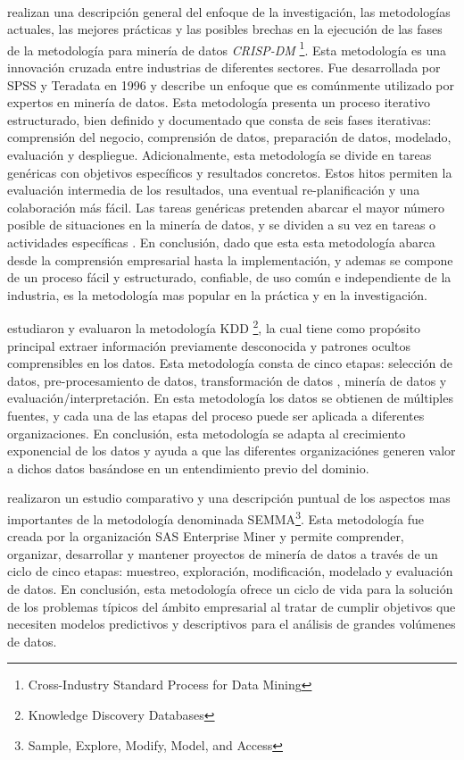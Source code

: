 \\
\cite{Schroer2021} realizan una descripción general del enfoque de la investigación, las metodologías actuales, las mejores prácticas y las posibles brechas en la ejecución de las fases de la metodología para minería de datos \textit{CRISP-DM} \footnote{Cross-Industry Standard Process for Data Mining }. Esta metodología es una innovación cruzada entre industrias de diferentes sectores. Fue desarrollada por SPSS y Teradata en 1996 y describe un enfoque  que es comúnmente utilizado por expertos en minería de datos. Esta metodología presenta un proceso iterativo estructurado, bien definido y documentado que consta de seis fases iterativas: comprensión del negocio, comprensión de datos, preparación de datos, modelado, evaluación y despliegue. Adicionalmente, esta metodología se divide en tareas genéricas con objetivos específicos y resultados concretos. Estos hitos permiten la evaluación intermedia de los resultados, una eventual re-planificación y una colaboración más fácil. Las tareas genéricas pretenden abarcar el mayor número posible de situaciones en la minería de datos, y se dividen a su vez en tareas o actividades específicas \cite{Mladenic2012}. En conclusión, dado que esta esta metodología abarca desde la comprensión empresarial hasta la implementación, y ademas se compone de un proceso fácil y estructurado, confiable, de uso común e independiente de la industria, es la metodología mas popular en la práctica y en la investigación.

\cite{Safhi2019} estudiaron y evaluaron la metodología KDD \footnote{Knowledge Discovery Databases}, la cual tiene como propósito principal  extraer información previamente desconocida y patrones ocultos comprensibles en los datos. Esta metodología consta de cinco etapas: selección de datos,  pre-procesamiento de datos, transformación de datos , minería de datos y evaluación/interpretación. En esta metodología los datos se obtienen de múltiples fuentes, y cada una de las etapas del proceso puede ser aplicada a diferentes organizaciones. En conclusión, esta metodología se adapta al crecimiento exponencial de los datos y ayuda a que las diferentes organizaciónes generen valor a dichos datos basándose en un entendimiento previo del dominio.

\cite{Shafique2014} realizaron un estudio comparativo y una descripción puntual de los aspectos mas importantes  de la metodología denominada SEMMA\footnote{Sample, Explore, Modify, Model, and Access}. Esta metodología fue creada por la organización SAS Enterprise Miner y permite comprender, organizar, desarrollar y mantener proyectos de minería de datos a través de un ciclo de cinco etapas: muestreo, exploración, modificación, modelado y evaluación de datos.  En conclusión, esta metodología ofrece un ciclo de vida para la solución de los problemas típicos del ámbito empresarial al tratar de cumplir objetivos que necesiten modelos predictivos y descriptivos para el análisis de grandes volúmenes de datos.

